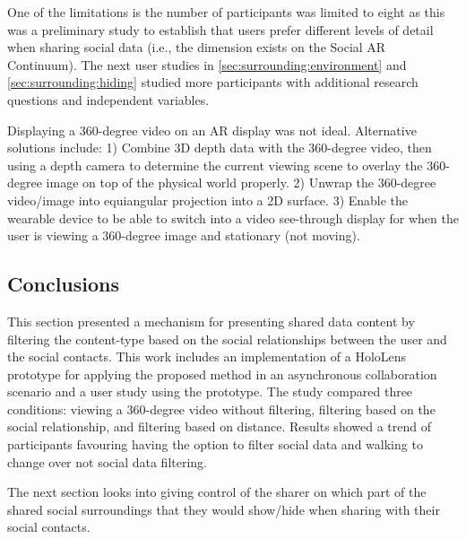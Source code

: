 One of the limitations is the number of participants was limited to eight as this was a preliminary study to establish that users prefer different levels of detail when sharing social data (i.e., the dimension exists on the Social AR Continuum). The next user studies in \ref{sec:surrounding:environment} and \ref{sec:surrounding:hiding} studied more participants with additional research questions and independent variables.


Displaying a 360-degree video on an AR display was not ideal. Alternative solutions include: 1) Combine 3D depth data with the 360-degree video, then using a depth camera to determine the current viewing scene to overlay the 360-degree image on top of the physical world properly. 2) Unwrap the 360-degree video/image into equiangular projection into a 2D surface. 3) Enable the wearable device to be able to switch into a video see-through display for when the user is viewing a 360-degree image and stationary (not moving).




\subsection{Conclusions}

This section presented a mechanism for presenting shared data content by filtering the content-type based on the social relationships between the user and the social contacts. This work includes an implementation of a HoloLens prototype for applying the proposed method in an asynchronous collaboration scenario and a user study using the prototype. The study compared three conditions: viewing a 360-degree video without filtering, filtering based on the social relationship, and filtering based on distance. Results showed a trend of participants favouring having the option to filter social data and walking to change over not social data filtering. 

The next section looks into giving control of the sharer on which part of the shared social surroundings that they would show/hide when sharing with their social contacts. 